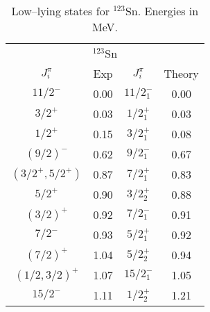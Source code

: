 \begin{table}[htbp]
\begin{center}
\begin{tabular}{cccc}
\hline 
\multicolumn{4}{c}{ $^{123}$Sn} \\ 
{$J^{\pi}_i$} &{Exp} &{$J^{\pi}_i$} &{Theory} \\
\hline 
$11/2^{-}$           & 0.00 & $11/2^{-}_{1}$ & 0.00 \\
$3/2^{+}$            & 0.03 & $1/2^{+}_{1}$  & 0.03 \\
$1/2^{+}$            & 0.15 & $3/2^{+}_{1}$  & 0.08 \\
$(9/2)^{-}$          & 0.62 & $9/2^{-}_{1}$  & 0.67 \\
$(3/2^{+},5/2^{+})$  & 0.87 & $7/2^{+}_{1}$  & 0.83 \\
$5/2^{+}$            & 0.90 & $3/2^{+}_{2}$  & 0.88 \\
$(3/2)^{+}$          & 0.92 & $7/2^{-}_{1}$  & 0.91 \\
$7/2^{-}$            & 0.93 & $5/2^{+}_{1}$  & 0.92 \\
$(7/2)^{+}$          & 1.04 & $5/2^{+}_{2}$  & 0.94 \\
$(1/2,3/2)^{+}$      & 1.07 & $15/2^{-}_{1}$ & 1.05 \\
$15/2^{-}$           & 1.11 & $1/2^{+}_{2}$  & 1.21 \\
\hline 
\end{tabular}
\caption{Low--lying states for $^{123}$Sn. Energies in MeV.}
\label{tab:123sn}
\end{center}
\end{table}

